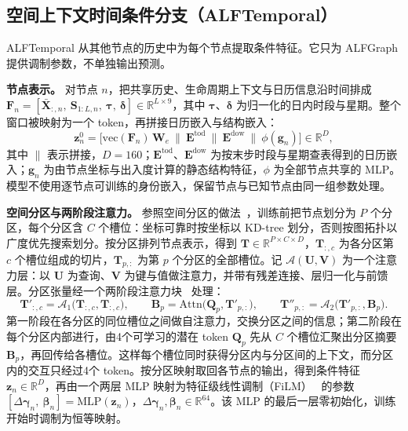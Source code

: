 \subsection{空间上下文时间条件分支（ALFTemporal）}\label{sec:3_3}

ALFTemporal 从其他节点的历史中为每个节点提取条件特征。它只为 ALFGraph 提供调制参数，不单独输出预测。

\textbf{节点表示。} 对节点 $n$，把共享历史、生命周期上下文与日历信息沿时间排成 $\mathbf{F}_n=[\bar{\mathbf{X}}_{:,n},\ \mathbf{S}_{1:L,n},\ \boldsymbol{\tau},\ \boldsymbol{\delta}]\in\mathbb{R}^{L\times9}$，其中 $\boldsymbol{\tau}$、$\boldsymbol{\delta}$ 为归一化的日内时段与星期。整个窗口被映射为一个 token，再拼接日历嵌入与结构嵌入：
\begin{equation}\label{eq:6}
\mathbf{z}^{0}_n=\big[\mathrm{vec}(\mathbf{F}_n)\,\mathbf{W}_e\ \|\ \mathbf{E}^{\mathrm{tod}}\ \|\ \mathbf{E}^{\mathrm{dow}}\ \|\ \phi(\mathbf{g}_n)\big]\in\mathbb{R}^{D},
\end{equation}
其中 $\|$ 表示拼接，$D=160$；$\mathbf{E}^{\mathrm{tod}}$、$\mathbf{E}^{\mathrm{dow}}$ 为按末步时段与星期查表得到的日历嵌入；$\mathbf{g}_n$ 为由节点坐标与出入度计算的静态结构特征，$\phi$ 为全部节点共享的 MLP。模型不使用逐节点可训练的身份嵌入，保留节点与已知节点由同一组参数处理。

\textbf{空间分区与两阶段注意力。} 参照空间分区的做法~\citep{fang2025efficient}，训练前把节点划分为 $P$ 个分区，每个分区含 $C$ 个槽位：坐标可靠时按坐标以 KD-tree 划分，否则按图拓扑以广度优先搜索划分。按分区排列节点表示，得到 $\mathbf{T}\in\mathbb{R}^{P\times C\times D}$，$\mathbf{T}_{:,c}$ 为各分区第 $c$ 个槽位组成的切片，$\mathbf{T}_{p,:}$ 为第 $p$ 个分区的全部槽位。记 $\mathcal{A}(\mathbf{U},\mathbf{V})$ 为一个注意力层：以 $\mathbf{U}$ 为查询、$\mathbf{V}$ 为键与值做注意力，并带有残差连接、层归一化与前馈层。分区张量经一个两阶段注意力块~\citep{zhang2023crossformer} 处理：
\begin{equation}\label{eq:7}
\mathbf{T}'_{:,c}=\mathcal{A}_1\big(\mathbf{T}_{:,c},\mathbf{T}_{:,c}\big),\qquad \mathbf{B}_p=\mathrm{Attn}\big(\mathbf{Q}_p,\mathbf{T}'_{p,:}\big),\qquad \mathbf{T}''_{p,:}=\mathcal{A}_2\big(\mathbf{T}'_{p,:},\mathbf{B}_p\big).
\end{equation}
第一阶段在各分区的同位槽位之间做自注意力，交换分区之间的信息；第二阶段在每个分区内部进行，由4个可学习的潜在 token $\mathbf{Q}_p$ 先从 $C$ 个槽位汇聚出分区摘要 $\mathbf{B}_p$，再回传给各槽位。这样每个槽位同时获得分区内与分区间的上下文，而分区内的交互只经过4个 token。按分区映射取回各节点的输出，得到条件特征 $\mathbf{z}_n\in\mathbb{R}^{D}$，再由一个两层 MLP 映射为特征级线性调制（FiLM）~\citep{perez2018film} 的参数 $[\Delta\boldsymbol{\gamma}_n,\ \boldsymbol{\beta}_n]=\mathrm{MLP}(\mathbf{z}_n)$，$\Delta\boldsymbol{\gamma}_n,\boldsymbol{\beta}_n\in\mathbb{R}^{64}$。该 MLP 的最后一层零初始化，训练开始时调制为恒等映射。

